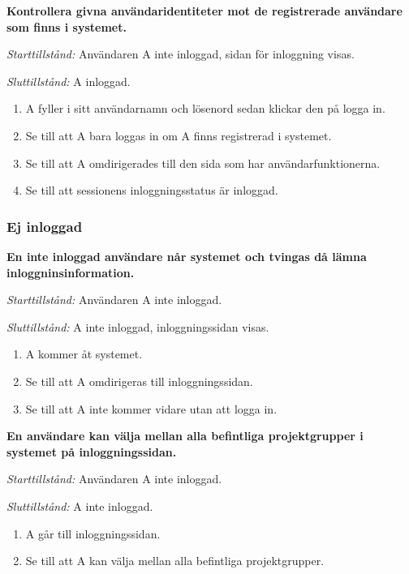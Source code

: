 \documentclass[a4paper]{article}
\begin{document}
\begin{FT}
\item
\textbf{Kontrollera givna användaridentiteter mot de registrerade användare som finns i systemet.}

\emph{Starttillstånd:} Användaren A inte inloggad, sidan för inloggning visas.

\emph{Sluttillstånd:} A inloggad.

\begin{enumerate}
\item A fyller i sitt användarnamn och lösenord sedan klickar den på logga in.
\item Se till att A bara loggas in om A finns registrerad i systemet.
\item Se till att A omdirigerades till den sida som har användarfunktionerna.
\item Se till att sessionens inloggningsstatus är inloggad.
\end{enumerate}

\subsubsection{Ej inloggad}

\item
\textbf{En inte inloggad användare når systemet och tvingas då lämna inloggninsinformation.}

\emph{Starttillstånd:} Användaren A inte inloggad.

\emph{Sluttillstånd:} A inte inloggad, inloggningssidan visas.

\begin{enumerate}
\item A kommer åt systemet.
\item Se till att A omdirigeras till inloggningssidan.
\item Se till att A inte kommer vidare utan att logga in.
\end{enumerate}

\item
\textbf{En användare kan välja mellan alla befintliga projektgrupper i systemet på inloggningssidan.}

\emph{Starttillstånd:} Användaren A inte inloggad.

\emph{Sluttillstånd:} A inte inloggad.

\begin{enumerate}
\item A går till inloggningssidan.
\item Se till att A kan välja mellan alla befintliga projektgrupper.
\end{enumerate}


\end{FT}
\end{document}
